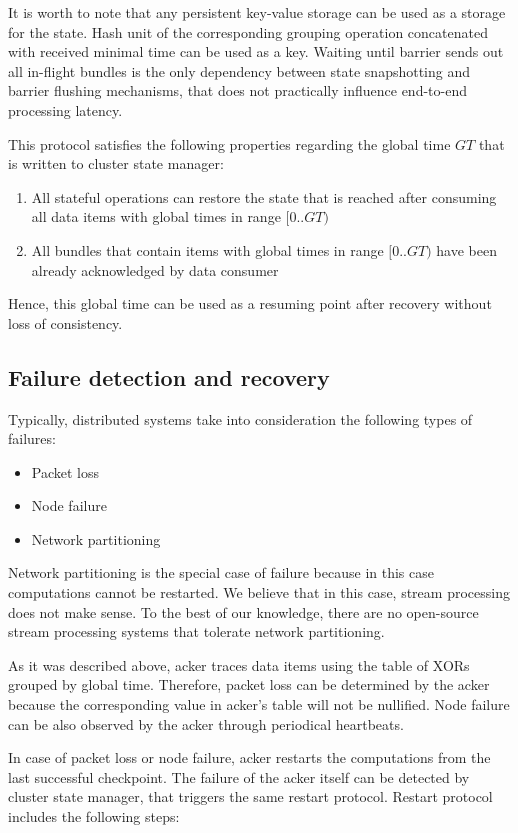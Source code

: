 It is worth to note that any persistent key-value storage can be used as a storage for the state. Hash unit of the corresponding grouping operation concatenated with received minimal time can be used as a key. Waiting until barrier sends out all in-flight bundles is the only dependency between state snapshotting and barrier flushing mechanisms, that does not practically influence end-to-end processing latency. 

This protocol satisfies the following properties regarding the global time $GT$ that is written to cluster state manager:
\begin{enumerate}
    \item All stateful operations can restore the state that is reached after consuming all data items with global times in range $[0..GT)$ 
    \item All bundles that contain items with global times in range $[0..GT)$ have been already acknowledged by data consumer 
\end{enumerate}

Hence, this global time can be used as a resuming point after recovery without loss of consistency.

\subsection{Failure detection and recovery}
Typically, distributed systems take into consideration the following types of failures:
\begin{itemize}
    \item Packet loss
    \item Node failure
    \item Network partitioning
\end{itemize}

Network partitioning is the special case of failure because in this case computations cannot be restarted. We believe that in this case, stream processing does not make sense. To the best of our knowledge, there are no open-source stream processing systems that tolerate network partitioning.

As it was described above, acker traces data items using the table of XORs grouped by global time. Therefore, packet loss can be determined by the acker because the corresponding value in acker's table will not be nullified. Node failure can be also observed by the acker through periodical heartbeats. 

In case of packet loss or node failure, acker restarts the computations from the last successful checkpoint. The failure of the acker itself can be detected by cluster state manager, that triggers the same restart protocol. Restart protocol includes the following steps:

